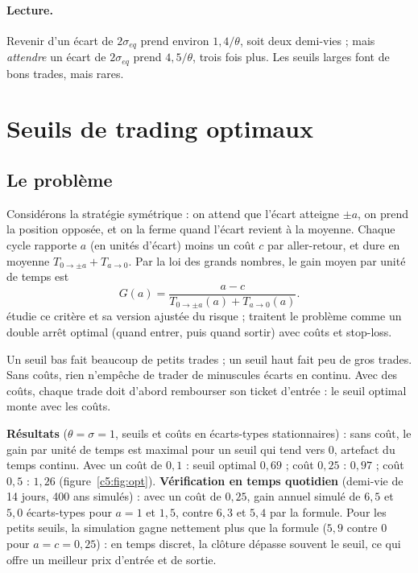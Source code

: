 \paragraph{Lecture.} Revenir d'un écart de $2\sigma_{eq}$ prend environ $1{,}4/\theta$, soit deux demi-vies ; mais \emph{attendre} un écart de $2\sigma_{eq}$ prend $4{,}5/\theta$, trois fois plus. Les seuils larges font de bons trades, mais rares.

\section{Seuils de trading optimaux}

\subsection{Le problème}

Considérons la stratégie symétrique : on attend que l'écart atteigne $\pm a$, on prend la position opposée, et on la ferme quand l'écart revient à la moyenne. Chaque cycle rapporte $a$ (en unités d'écart) moins un coût $c$ par aller-retour, et dure en moyenne $T_{0\to\pm a} + T_{a\to0}$. Par la loi des grands nombres, le gain moyen par unité de temps est
\[
G(a) = \frac{a - c}{T_{0\to\pm a}(a) + T_{a\to0}(a)}.
\]
\citet{bertram2010} étudie ce critère et sa version ajustée du risque ; \citet{leungli2015} traitent le problème comme un double arrêt optimal (quand entrer, puis quand sortir) avec coûts et stop-loss.

\begin{intuition}
Un seuil bas fait beaucoup de petits trades ; un seuil haut fait peu de gros trades. Sans coûts, rien n'empêche de trader de minuscules écarts en continu. Avec des coûts, chaque trade doit d'abord rembourser son ticket d'entrée : le seuil optimal monte avec les coûts.
\end{intuition}

\begin{codebox}
\textbf{Résultats} ($\theta = \sigma = 1$, seuils et coûts en écarts-types stationnaires) : sans coût, le gain par unité de temps est maximal pour un seuil qui tend vers 0, artefact du temps continu. Avec un coût de $0{,}1$ : seuil optimal $0{,}69$ ; coût $0{,}25$ : $0{,}97$ ; coût $0{,}5$ : $1{,}26$ (figure~\ref{c5:fig:opt}). \textbf{Vérification en temps quotidien} (demi-vie de 14 jours, 400 ans simulés) : avec un coût de $0{,}25$, gain annuel simulé de $6{,}5$ et $5{,}0$ écarts-types pour $a = 1$ et $1{,}5$, contre $6{,}3$ et $5{,}4$ par la formule. Pour les petits seuils, la simulation gagne nettement plus que la formule ($5{,}9$ contre 0 pour $a = c = 0{,}25$) : en temps discret, la clôture dépasse souvent le seuil, ce qui \og offre\fg{} un meilleur prix d'entrée et de sortie.
\end{codebox}

